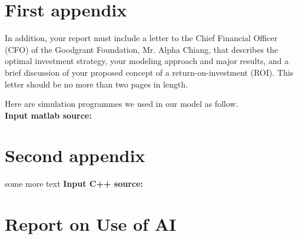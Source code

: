 \documentclass{mcmthesis}
\begin{document}
\newpage

\begin{appendices}

\section{First appendix}

In addition, your report must include a letter to the Chief Financial Officer (CFO) of the Goodgrant Foundation, Mr. Alpha Chiang, that describes the optimal investment strategy, your modeling approach and major results, and a brief discussion of your proposed concept of a return-on-investment (ROI). This letter should be no more than two pages in length.

Here are simulation programmes we used in our model as follow.\\

\textbf{\textcolor[rgb]{0.98,0.00,0.00}{Input matlab source:}}


\section{Second appendix}

some more text \textcolor[rgb]{0.98,0.00,0.00}{\textbf{Input C++ source:}}


\end{appendices}

\newpage
{}
\setcounter{lastpage}{\value{page}}
\thispagestyle{empty} 

\section*{Report on Use of AI}
\end{document}
